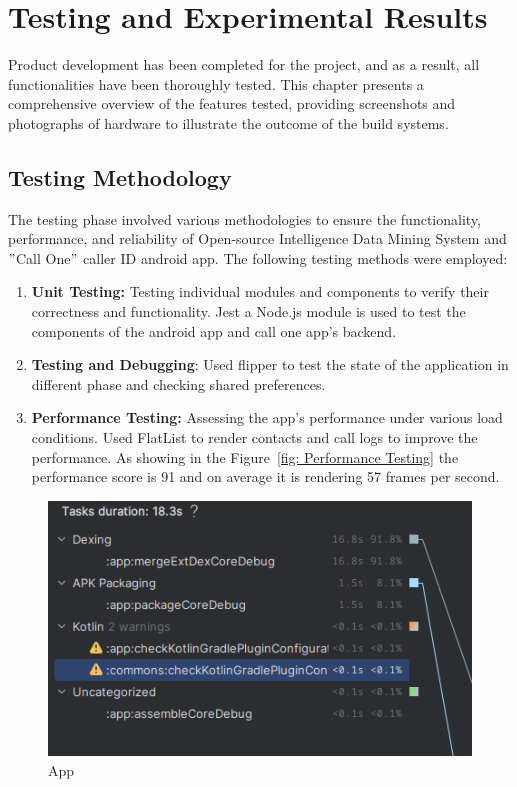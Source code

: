 \chapter{Testing and Experimental Results}\label{ch:testing-and-experimental-results}
\justify

Product development has been completed for the project, and as a result, all functionalities have been thoroughly tested.
This chapter presents a comprehensive overview of the features tested, providing screenshots and photographs of hardware to illustrate the outcome of the build systems.

\section{Testing Methodology}\label{sec:testing-methodology}

The testing phase involved various methodologies to ensure the functionality, performance, and reliability of Open-source Intelligence Data Mining System and  \("\)Call One\("\) caller ID  android app.
The following testing methods were employed:

\begin{enumerate}[label=\roman*.]
    \item \textbf{Unit Testing:} Testing individual modules and components to verify their correctness and functionality.
    Jest a Node.js module is used to test the components of the android app and call one app's backend.

    \item \textbf{Testing and Debugging}: Used flipper to test the state of the application in different phase and checking shared preferences.
 
    \item \textbf{Performance Testing:} Assessing the app's performance under various load conditions.
    Used FlatList to render contacts and call logs to improve the performance.
    As showing in the Figure~\ref{fig: Performance Testing} the performance score is 91 and on average it is rendering 57 frames per second.

\end{enumerate}

\begin{figure}[h]
    \centering
    \includegraphics[width=1\linewidth]{Media/img}
    \caption{App}
    \label{fig:app-building}
\end{figure}


